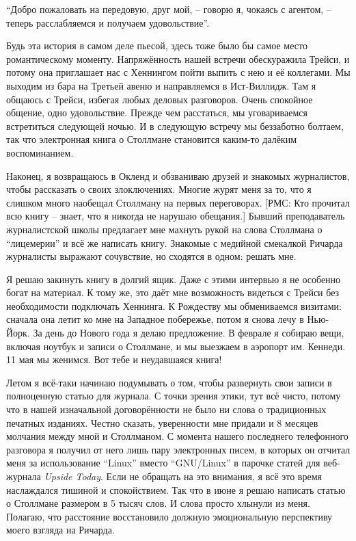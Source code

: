 \enquote{Добро пожаловать на передовую, друг мой, -- говорю я, чокаясь с агентом, -- теперь расслабляемся и получаем удовольствие}.

Будь эта история в самом деле пьесой, здесь тоже было бы самое место романтическому моменту. Напряжённость нашей встречи обескуражила Трейси, и потому она приглашает нас с Хеннингом пойти выпить с нею и её коллегами. Мы выходим из бара на Третьей авеню и направляемся в Ист-Виллидж. Там я общаюсь с Трейси, избегая любых деловых разговоров. Очень спокойное общение, одно удовольствие. Прежде чем расстаться, мы уговариваемся встретиться следующей ночью. И в следующую встречу мы беззаботно болтаем, так что электронная книга о Столлмане становится каким-то далёким воспоминанием.

Наконец, я возвращаюсь в Окленд и обзваниваю друзей и знакомых журналистов, чтобы рассказать о своих злоключениях. Многие журят меня за то, что я слишком много наобещал Столлману на первых переговорах. [РМС: Кто прочитал всю книгу -- знает, что я никогда не нарушаю обещания.] Бывший преподаватель журналистской школы предлагает мне махнуть рукой на слова Столлмана о \enquote{лицемерии} и всё же написать книгу. Знакомые с медийной смекалкой Ричарда журналисты выражают сочувствие, но сходятся в одном: решать мне.

Я решаю закинуть книгу в долгий ящик. Даже с этими интервью я не особенно богат на материал. К тому же, это даёт мне возможность видеться с Трейси без необходимости подключать Хеннинга. К Рождеству мы обмениваемся визитами: сначала она летит ко мне на Западное побережье, потом я снова лечу в Нью-Йорк. За день до Нового года я делаю предложение. В феврале я собираю вещи, включая ноутбук и записи о Столлмане, и мы выезжаем в аэропорт им. Кеннеди. 11 мая мы женимся. Вот тебе и неудавшаяся книга!

Летом я всё-таки начинаю подумывать о том, чтобы развернуть свои записи в полноценную статью для журнала. С точки зрения этики, тут всё чисто, потому что в нашей изначальной договорённости не было ни слова о традиционных печатных изданиях. Честно сказать, уверенности мне придали и 8 месяцев молчания между мной и Столлманом. С момента нашего последнего телефонного разговора я получил от него лишь пару электронных писем, в которых он отчитал меня за использование \enquote{Linux} вместо \enquote{GNU/Linux} в парочке статей для веб-журнала \textit{Upside Today}. Если не обращать на это внимания, я всё это время наслаждался тишиной и спокойствием. Так что в июне я решаю написать статью о Столлмане размером в 5 тысяч слов. И слова просто хлынули из меня. Полагаю, что расстояние восстановило должную эмоциональную перспективу моего взгляда на Ричарда.

